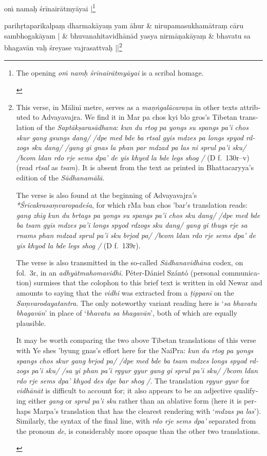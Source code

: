 \documentclass[naipra.tex]{subfiles}
\begin{document}
\beginnumbering
\begin{sanskrit}
\pstart\noindent
{}oṁ namaḥ śrīnairātmyāyai |\footnote{\begin{english}
	The opening \emph{oṁ namḥ śrīnairātmyāyai} is a scribal homage.
\end{english}}
\pend

\medskip\versequote
parihṛtaparikalpaṃ dharmakāyaṃ yam āhur &
\hspace{20pt}nirupamasukhamātraṃ cāru sambhogakāyam | \&
\versequote
bhuvanahitavidhānād yasya nirmāṇakāyaṃ &
\hspace{20pt}bhavatu sa bhagavān vaḥ śreyase vajrasattvaḥ ||\footnote{
	\begin{english}%
	This verse, in Mālinī metre, serves as a \emph{maṇṅgalācaraṇa} in other texts attributed to Advayavajra.
	We find it in Mar pa chos kyi blo gros's Tibetan translation of the \emph{Saptākṣarasādhana}: \emph{kun du rtog pa yongs su spangs pa'i chos skur gang gsungs dang/ /dpe med bde ba rtsal gyis mdzes pa longs spyod rdzogs sku dang/ /gang gi gnas la phan par mdzad pa las ni sprul pa'i sku/ /bcom ldan rdo rje sems dpa' de yis khyed la bde legs shog /} (D f.\ 130r–v) (read \emph{rtsal} as \emph{tsam}).
	It is absent from the text as printed in Bhattacaryya's edition of the \emph{Sādhanamālā}.

	The verse is also found at the beginning of Advayavajra's \emph{*Śrīcakrasaṃvaropadeśa}, for which rMa ban chos 'bar's translation reads: \emph{gang zhig kun du brtags pa yongs su spangs pa'i chos sku dang/ /dpe med bde ba tsam gyis mdzes pa'i longs spyod rdzogs sku dang/ gang gi thugs rje sa rnams phan mdzad sprul pa'i sku brjod pa/ /bcom ldan rdo rje sems dpa' de yis khyod la bde legs shog /} (D f.\ 139r).

	The verse is also transmitted in the so-called \emph{Sādhanavidhāna} codex, on fol.\ 3r, in an \emph{adhyātmahomavidhi}.
	Péter-Dániel Szántó (personal communication) surmises that the colophon to this brief text is written in old Newar and amounts to saying that the \emph{vidhi} was extracted from a \emph{ṭippanī} on the \emph{Saṃvarodayatantra}. 
	The only noteworthy variant reading here is `\emph{sa bhavatu bhagavān}' in place of `\emph{bhavatu sa bhagavān}', both of which are equally plausible.

	It may be worth comparing the two above Tibetan translations of this verse with Ye shes 'byung gnas's effort here for the NaiPra: \emph{kun du rtog pa yongs spangs chos skur gang brjod pa/ /dpe med bde ba tsam mdzes longs spyod rdzogs pa'i sku/ /sa yi phan pa'i rgyur gyur gang gi sprul pa'i sku/ /bcom ldan rdo rje sems dpa' khyod des dge bar shog /}. 
	The translation \emph{rgyur gyur} for \emph{vidhānāt} is difficult to account for; it also appears to be an adjective qualifying either \emph{gang} or \emph{sprul pa'i sku} rather than an ablative form (here it is perhaps Marpa's translation that has the clearest rendering with `\emph{mdzas pa las}').
	Similarly, the syntax of the final line, with \emph{rdo rje sems dpa'} separated from the pronoun \emph{de}, is considerably more opaque than the other two translations.


\end{english}}
\end{sanskrit}
\end{document}
